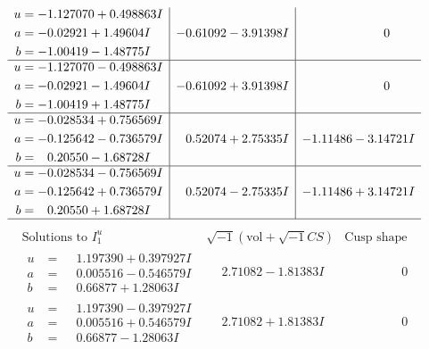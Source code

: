 \documentclass[1p]{elsarticle_modified}
\theoremstyle{definition}
\newcommand{\I}{\sqrt{-1}}
\begin{document}
$$\begin{array}{c|c|c}
\begin{aligned}
u &= -1.127070 + 0.498863 I \\
a &= -0.02921 + 1.49604 I \\
b &= -1.00419 - 1.48775 I\end{aligned}
 & -0.61092 - 3.91398 I & \phantom{-0.000000 } 0 \\ \hline\begin{aligned}
u &= -1.127070 - 0.498863 I \\
a &= -0.02921 - 1.49604 I \\
b &= -1.00419 + 1.48775 I\end{aligned}
 & -0.61092 + 3.91398 I & \phantom{-0.000000 } 0 \\ \hline\begin{aligned}
u &= -0.028534 + 0.756569 I \\
a &= -0.125642 - 0.736579 I \\
b &= \phantom{-}0.20550 - 1.68728 I\end{aligned}
 & \phantom{-}0.52074 + 2.75335 I & -1.11486 - 3.14721 I \\ \hline\begin{aligned}
u &= -0.028534 - 0.756569 I \\
a &= -0.125642 + 0.736579 I \\
b &= \phantom{-}0.20550 + 1.68728 I\end{aligned}
 & \phantom{-}0.52074 - 2.75335 I & -1.11486 + 3.14721 I\\
 \hline 
 \end{array}$$\newpage$$\begin{array}{c|c|c}  
\text{Solutions to }I^u_{1}& \I (\text{vol} + \sqrt{-1}CS) & \text{Cusp shape}\\
 \hline 
\begin{aligned}
u &= \phantom{-}1.197390 + 0.397927 I \\
a &= \phantom{-}0.005516 - 0.546579 I \\
b &= \phantom{-}0.66877 + 1.28063 I\end{aligned}
 & \phantom{-}2.71082 - 1.81383 I & \phantom{-0.000000 } 0 \\ \hline\begin{aligned}
u &= \phantom{-}1.197390 - 0.397927 I \\
a &= \phantom{-}0.005516 + 0.546579 I \\
b &= \phantom{-}0.66877 - 1.28063 I\end{aligned}
 & \phantom{-}2.71082 + 1.81383 I & \phantom{-0.000000 } 0 \\ \hline\begin{aligned}

\end{aligned}
\end{array}$$
\end{document}
